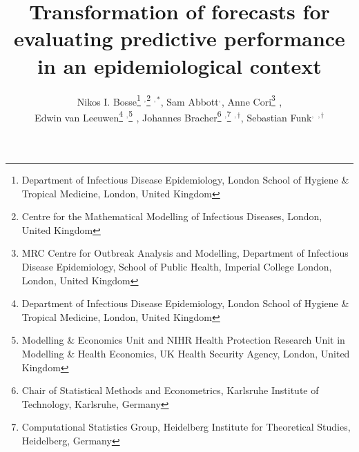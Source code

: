 \documentclass{article}
\begin{document}
\title{Transformation of forecasts for evaluating predictive performance in an epidemiological context}
  \author{Nikos I. Bosse\thanks{Department of Infectious Disease Epidemiology, London School of Hygiene \& Tropical Medicine, London, United Kingdom} $^{,}$\thanks{Centre for the Mathematical Modelling of Infectious Diseases, London, United Kingdom} $^{,*}$, 
  Sam Abbott\footnotemark[1] $^{,}$\footnotemark[2]$ ^{}$, 
  Anne Cori\thanks{MRC Centre for Outbreak Analysis and Modelling, Department of Infectious Disease Epidemiology, School of Public Health, Imperial College London, London, United Kingdom} $^{}$, \\
  Edwin van Leeuwen\thanks{Department of Infectious Disease Epidemiology, London School of Hygiene \& Tropical Medicine, London, United Kingdom} $^{,}$\thanks{Modelling & Economics Unit and NIHR Health Protection Research Unit in Modelling \& Health Economics, UK Health Security Agency, London, United Kingdom} $^{}$, 
  Johannes Bracher\thanks{Chair of Statistical Methods and Econometrics, Karlsruhe Institute of Technology, Karlsruhe, Germany } $^{,}$\thanks{Computational Statistics Group, Heidelberg Institute for Theoretical Studies, Heidelberg, Germany } $^{, \dagger}$, 
  Sebastian Funk\footnotemark[1] $^{, }$\footnotemark[2]$ ^{}$ $ ^{, \dagger}$}
\end{document}
